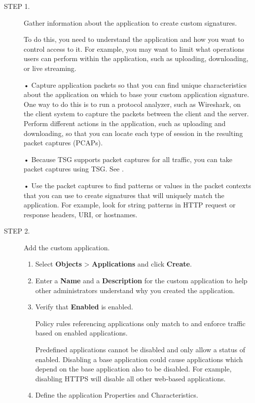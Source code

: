 \begin{description}
    \item[STEP 1.]	Gather information about the application to create custom signatures.


    To do this, you need to understand the application and how you want to control access to it. For example, you may want to limit what operations users 
    can perform within the application, such as uploading, downloading, or live streaming.


    • Capture application packets so that you can find unique characteristics about the application on which to base your custom application signature. 
    One way to do this is to run a protocol analyzer, such as Wireshark, on the client system to capture the packets between the client and the server. 
    Perform different actions in the application, such as uploading and downloading, so that you can locate each type of session in the resulting packet captures (PCAPs).


    • Because TSG supports packet captures for all traffic, you can take packet captures using TSG. See \hyperlink{link:Take Packet Captures}{\color{linkblue}{Take Packet Captures}}.


    • Use the packet captures to find patterns or values in the packet contexts that you can use to create signatures that will uniquely match the application. 
    For example, look for string patterns in HTTP request or response headers, URI, or hostnames.
    \item[STEP 2.]	Add the custom application.
    \begin{enumerate}  
        \item Select \textbf{Objects} > \textbf{Applications} and click \textbf{Create}.
        \item Enter a \textbf{Name} and a \textbf{Description} for the custom application to help other administrators understand why you created the application.
        \item Verify that \textbf{Enabled} is enabled.
        

            Policy rules referencing applications only match to and enforce traffic based on enabled applications. 
        
        
            Predefined applications cannot be disabled and only allow a status of enabled. Disabling a base application could cause applications which 
            depend on the base application also to be disabled. For example, disabling HTTPS will disable all other web-based applications.
        \item Define the application Properties and Characteristics.
        


\end{enumerate}
\end{description}
